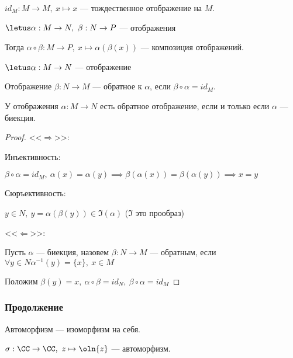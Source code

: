 \begin{defn}
    $id_M: M \to M,~x \mapsto x$ --- тождественное отображение на $M$.
\end{defn}

\begin{defn}
    $\letus \alpha: M \to N,~\beta: N \to P$ --- отображения
    
    Тогда $\alpha \circ \beta: M \to P,~x \mapsto \alpha(\beta(x))$ --- композиция отображений.
\end{defn}

\begin{defn}
    $\letus \alpha: M \to N$ --- отображение

    Отображение $\beta: N \to M$ --- обратное к $\alpha$, если $\beta \circ \alpha = id_M$.
\end{defn}

\begin{theorem-non}
    У отображения $\alpha: M \to N$ есть обратное отображение, если и только если $\alpha$ --- биекция.
\end{theorem-non}

\begin{proof}
    
    <<$\Rightarrow$>>:
    
    Инъективность:
    
    $\beta \circ \alpha = id_M,~\alpha(x) = \alpha(y) \implies \beta(\alpha(x)) = \beta(\alpha(y)) \implies x = y$
    
    Сюръективность:
    
    $y \in N,~y = \alpha(\beta(y)) \in \Im(\alpha)$ ($\Im$ это прообраз)
    
    <<$\Leftarrow$>>:
    
    Пусть $\alpha$ --- биекция, назовем $\beta: N \to M$ --- обратным, если $\forall y \in N \alpha^{-1}(y) = \{x\},~x \in M$
    
    Положим $\beta(y) = x,~\alpha \circ \beta = id_N,~\beta \circ \alpha = id_M$
\end{proof}

\subsubsection*{Продолжение}

\begin{defn}
    Автоморфизм --- изоморфизм на себя.
\end{defn}

\begin{theorem-non}
    $\sigma: \CC \to \CC,~z \mapsto \oln{z}$ --- автоморфизм.
\end{theorem-non}

